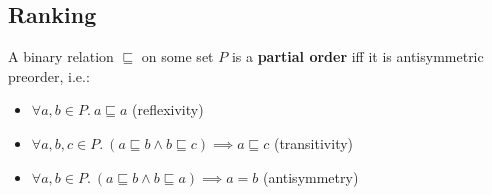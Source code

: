 \subsection{Ranking}


%

\begin{definition}
    A binary relation $\sqsubseteq$ on some set $P$ is a \textbf{partial order} iff it is antisymmetric preorder, i.e.:
    \begin{itemize}
        \item $\forall a, b \in P.\ a \sqsubseteq a$ \tabto{7.3cm}(reflexivity)
        \item $\forall a, b, c \in P.\ (a \sqsubseteq b \wedge b \sqsubseteq c) \implies a \sqsubseteq c$ \tabto{7.3cm}(transitivity)
        \item $\forall a, b \in P.\ (a \sqsubseteq b \wedge b \sqsubseteq a) \implies a = b$ \tabto{7.3cm}(antisymmetry)
    \end{itemize}
\end{definition}

